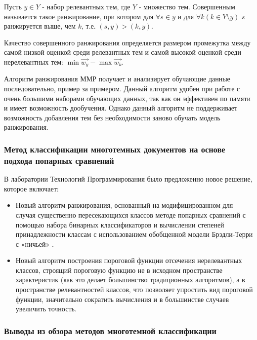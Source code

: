 \documentclass[russian, utf8, emptystyle]{eskdtext}
\begin{document}
Пусть $y \in Y$ - набор релевантных тем, где $Y$ - множество тем. Совершенным называется такое ранжирование, при котором для $\forall s \in y$ и для $\forall k (k \in Y\setminus y)$ $s$ ранжируется выше, чем $k$, т.е. $(s,y)>(k,y)$.

Качество совершенного ранжирования определяется размером промежутка между самой низкой оценкой среди релевантных тем и самой высокой оценкой среди нерелевантных тем: $\min{\vec{w_y}}-\max{\vec{w_k}}$.

Алгоритм ранжирования ММР получает и анализирует обучающие данные последовательно, пример за примером. Данный алгоритм удобен при работе с очень большими наборами обучающих данных, так как он эффективен по памяти и имеет возможность дообучения. Однако данный алгоритм не поддерживает возможность добавления тем без необходимости заново обучать модель ранжирования.

\subsubsection{Метод классификации многотемных документов на основе подхода попарных сравнений}

В лаборатории Технологий Программирования было предложенно новое решение, которое включает:

\begin{itemize}
	\item Новый алгоритм ранжирования, основанный на модифицированном для случая существенно пересекающихся классов методе попарных сравнений с помощью набора бинарных классификаторов и вычислении степеней принадлежности классам  с использованием обобщенной модели Брэдли-Терри с «ничьей» \cite{bredli}.
	\item Новый алгоритм построения пороговой функции отсечения нерелевантных классов, строящий пороговую функцию не в исходном пространстве характеристик (как это делает большинство традиционных алгоритмов), а в пространстве релевантностей классов, что позволяет упростить вид пороговой функции, значительно сократить вычисления и в большинстве случаев увеличить точность.
\end{itemize}
\subsubsection{Выводы из обзора методов многотемной классификации}
\end{document}
